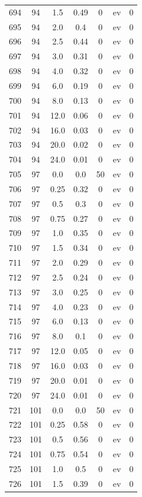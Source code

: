 \documentclass[12pt,a4paper]{article}
\begin{document}
\begin{tabular}{r|cccccc}
	694 & 94 & 1.5 & 0.49 & 0 & ev & 0 \\
	695 & 94 & 2.0 & 0.4 & 0 & ev & 0 \\
	696 & 94 & 2.5 & 0.44 & 0 & ev & 0 \\
	697 & 94 & 3.0 & 0.31 & 0 & ev & 0 \\
	698 & 94 & 4.0 & 0.32 & 0 & ev & 0 \\
	699 & 94 & 6.0 & 0.19 & 0 & ev & 0 \\
	700 & 94 & 8.0 & 0.13 & 0 & ev & 0 \\
	701 & 94 & 12.0 & 0.06 & 0 & ev & 0 \\
	702 & 94 & 16.0 & 0.03 & 0 & ev & 0 \\
	703 & 94 & 20.0 & 0.02 & 0 & ev & 0 \\
	704 & 94 & 24.0 & 0.01 & 0 & ev & 0 \\
	705 & 97 & 0.0 & 0.0 & 50 & ev & 0 \\
	706 & 97 & 0.25 & 0.32 & 0 & ev & 0 \\
	707 & 97 & 0.5 & 0.3 & 0 & ev & 0 \\
	708 & 97 & 0.75 & 0.27 & 0 & ev & 0 \\
	709 & 97 & 1.0 & 0.35 & 0 & ev & 0 \\
	710 & 97 & 1.5 & 0.34 & 0 & ev & 0 \\
	711 & 97 & 2.0 & 0.29 & 0 & ev & 0 \\
	712 & 97 & 2.5 & 0.24 & 0 & ev & 0 \\
	713 & 97 & 3.0 & 0.25 & 0 & ev & 0 \\
	714 & 97 & 4.0 & 0.23 & 0 & ev & 0 \\
	715 & 97 & 6.0 & 0.13 & 0 & ev & 0 \\
	716 & 97 & 8.0 & 0.1 & 0 & ev & 0 \\
	717 & 97 & 12.0 & 0.05 & 0 & ev & 0 \\
	718 & 97 & 16.0 & 0.03 & 0 & ev & 0 \\
	719 & 97 & 20.0 & 0.01 & 0 & ev & 0 \\
	720 & 97 & 24.0 & 0.01 & 0 & ev & 0 \\
	721 & 101 & 0.0 & 0.0 & 50 & ev & 0 \\
	722 & 101 & 0.25 & 0.58 & 0 & ev & 0 \\
	723 & 101 & 0.5 & 0.56 & 0 & ev & 0 \\
	724 & 101 & 0.75 & 0.54 & 0 & ev & 0 \\
	725 & 101 & 1.0 & 0.5 & 0 & ev & 0 \\
	726 & 101 & 1.5 & 0.39 & 0 & ev & 0 \\

\end{tabular}
\end{document}
